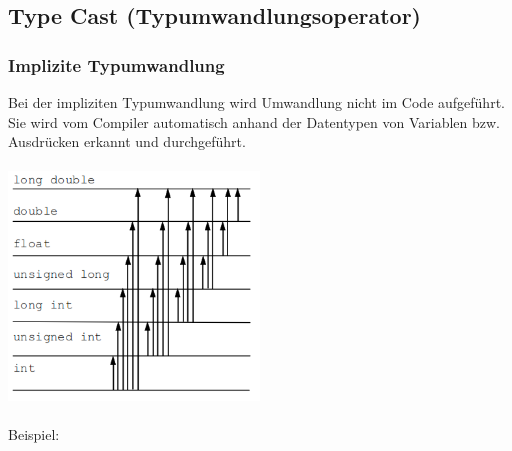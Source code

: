 			\subsection{Type Cast (Typumwandlungsoperator)}	
				\begin{minipage}[t]{9 cm}
					\subsubsection{Implizite Typumwandlung}
						Bei der impliziten Typumwandlung wird Umwandlung nicht im Code aufgeführt. Sie wird vom Compiler automatisch anhand der Datentypen von Variablen bzw. Ausdrücken erkannt und durchgeführt.\\\\
						\includegraphics[width=0.5\textwidth]{pics/typecast.png}	
						\\\\Beispiel:
						\vspace*{-0.2cm}
							
				\end{minipage}
				\hspace*{0.5cm}
